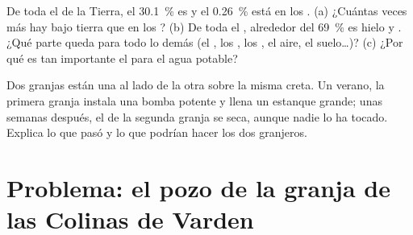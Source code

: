 \begin{exercise}[$\star\star\star$]\label{exo:g6:water-underground:11}
De toda el  de la Tierra, el 30.1~\% es  y el
0.26~\% está en los . (a) ¿Cuántas veces más  hay bajo
tierra que en los ? (b) De toda el , alrededor del 69~\% es
hielo y . ¿Qué parte queda para todo lo demás (el ,
los , los , el aire, el suelo\ldots)? (c) ¿Por qué es tan
importante el  para el agua potable?
\end{exercise}

\begin{exercise}[$\star\star\star$]\label{exo:g6:water-underground:12}
Dos granjas están una al lado de la otra sobre la misma creta. Un verano,
la primera granja instala una bomba potente y llena un estanque grande;
unas semanas después, el  de la segunda granja se seca, aunque nadie lo
ha tocado. Explica lo que pasó y lo que podrían hacer los dos granjeros.
\end{exercise}

\section{Problema: el pozo de la granja de las Colinas de Varden}

